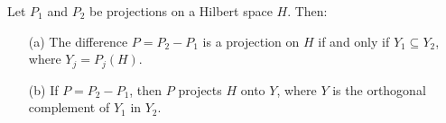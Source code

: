 \begin{theorem}\label{9.6-2}
    Let \( {P}_{1}  \) and \( {P}_{2} \) be projections on a Hilbert space \( H  \). Then:
    \begin{enumerate}
        \item[(a)] The difference \( P = {P}_{2} - {P}_{1} \) is a projection on \( H  \) if and only if \( {Y}_{1} \subseteq  {Y}_{2} \), where \( {Y}_{j} = {P}_{j}(H) \).
        \item[(b)] If \( P = {P}_{2} - {P}_{1} \), then \( P  \) projects \( H  \) onto \( Y  \), where \( Y  \) is the orthogonal complement of \( {Y}_{1} \) in \( {Y}_{2} \).
    \end{enumerate}
\end{theorem}
       
